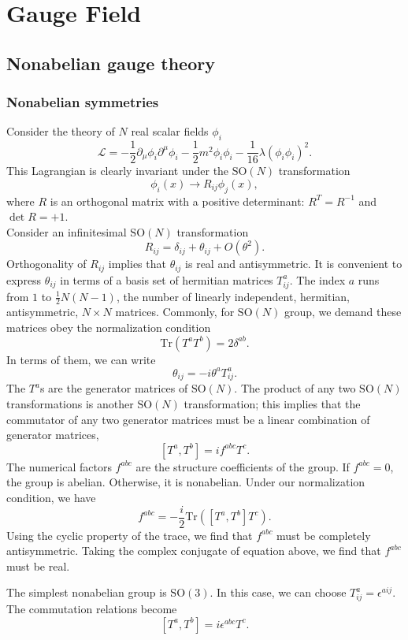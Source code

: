 \chapter{Gauge Field}
\section{Nonabelian gauge theory}
\subsection{Nonabelian symmetries}
Consider the theory of $N$ real scalar fields $\phi_i$
\[\mathcal{L} = -\frac{1}{2}\partial_{\mu}\phi_i \partial^{\mu}\phi_i - \frac{1}{2}m^2\phi_i\phi_i - \frac{1}{16}\lambda(\phi_i\phi_i)^2.\]
This Lagrangian is clearly invariant under the $\mathrm{SO}(N)$ transformation
\[\phi_i(x) \to R_{ij}\phi_j(x),\]
where $R$ is an orthogonal matrix with a positive determinant: $R^T = R^{-1}$ and $\det R = +1$.
\\
Consider an infinitesimal $\mathrm{SO}(N)$ transformation
\[R_{ij} = \delta_{ij} + \theta_{ij} + O(\theta^2).\]
Orthogonality of $R_{ij}$ implies that $\theta_{ij}$ is real and antisymmetric. It is convenient to express $\theta_{ij}$ in terms of a basis set of hermitian matrices $T^a_{ij}$. The index $a$ runs from $1$ to $\frac{1}{2}N(N-1)$, the number of linearly independent, hermitian, antisymmetric, $N \times N$ matrices. Commonly, for $\mathrm{SO}(N)$ group, we demand these matrices obey the normalization condition
\[\mathrm{Tr}(T^a T^b) = 2\delta^{ab}.\]
In terms of them, we can write
\[\theta_{ij} = -i\theta^a T^a_{ij}.\]
The $T^a$s are the generator matrices of $\mathrm{SO}(N)$. The product of any two $\mathrm{SO}(N)$ transformations is another $\mathrm{SO}(N)$ transformation; this implies that the commutator of any two generator matrices must be a linear combination of generator matrices,
\[[T^a,T^b] = if^{abc}T^c.\]
The numerical factors $f^{abc}$ are the structure coefficients of the group. If $f^{abc} = 0$, the group is abelian. Otherwise, it is nonabelian. Under our normalization condition, we have
\[f^{abc} = -\frac{i}{2} \mathrm{Tr} \left([T^a,T^b]T^c \right).\]
Using the cyclic property of the trace, we find that $f^{abc}$ must be completely antisymmetric. Taking the complex conjugate of equation above, we find that $f^{abc}$ must be real.

\begin{example}
The simplest nonabelian group is $\mathrm{SO}(3)$. In this case, we can choose $T^a_{ij} = \epsilon^{aij}$. The commutation relations become
\[[T^a,T^b] = i\epsilon^{abc}T^c.\]
\end{example}

